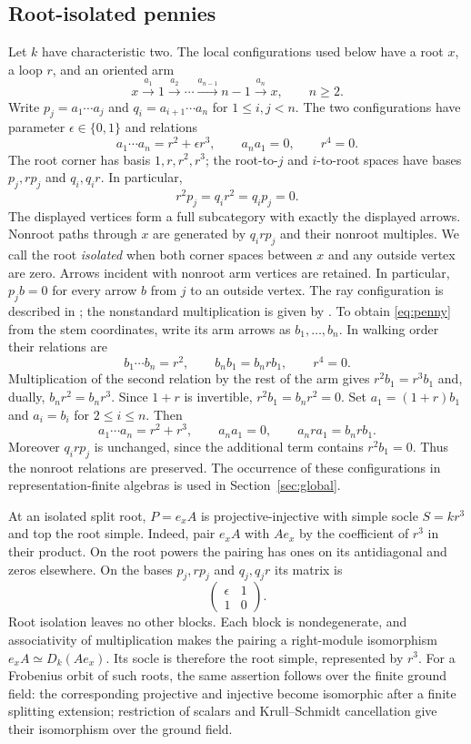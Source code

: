 \subsection{Root-isolated pennies}
Let $k$ have characteristic two. The local configurations used below have a root $x$, a loop $r$, and an oriented arm
\[
 x\xrightarrow{a_1}1\xrightarrow{a_2}\cdots
 \xrightarrow{a_{n-1}}n-1\xrightarrow{a_n}x,\qquad n\ge2.
\]
Write $p_j=a_1\cdots a_j$ and $q_i=a_{i+1}\cdots a_n$ for $1\le i,j<n$. The two configurations have parameter $\epsilon\in\{0,1\}$ and relations
\begin{equation}\label{eq:penny}
 a_1\cdots a_n=r^2+\epsilon r^3,\qquad a_na_1=0,
 \qquad r^4=0.
\end{equation}
The root corner has basis $1,r,r^2,r^3$; the root-to-$j$ and $i$-to-root spaces have bases $p_j,rp_j$ and $q_i,q_ir$. In particular,
\[
 r^2p_j=q_ir^2=q_ip_j=0.
\]
The displayed vertices form a full subcategory with exactly the displayed arrows. Nonroot paths through $x$ are generated by $q_irp_j$ and their nonroot multiples. We call the root \emph{isolated} when both corner spaces between $x$ and any outside vertex are zero. Arrows incident with nonroot arm vertices are retained. In particular, $p_jb=0$ for every arrow $b$ from $j$ to an outside vertex. The ray configuration is described in \cite[\S1 and Proposition 2]{Bongartz12}; the nonstandard multiplication is given by \cite[Theorem 10]{Bongartz13}. To obtain \eqref{eq:penny} from the stem coordinates, write its arm arrows as $b_1,\ldots,b_n$. In walking order their relations are
\[
 b_1\cdots b_n=r^2,\qquad b_nb_1=b_nrb_1,\qquad r^4=0.
\]
Multiplication of the second relation by the rest of the arm gives $r^2b_1=r^3b_1$ and, dually, $b_nr^2=b_nr^3$. Since $1+r$ is invertible, $r^2b_1=b_nr^2=0$. Set $a_1=(1+r)b_1$ and $a_i=b_i$ for $2\le i\le n$. Then
\[
 a_1\cdots a_n=r^2+r^3,\qquad a_na_1=0,
 \qquad a_nra_1=b_nrb_1.
\]
Moreover $q_irp_j$ is unchanged, since the additional term contains $r^2b_1=0$. Thus the nonroot relations are preserved. The occurrence of these configurations in representation-finite algebras is used in Section~\ref{sec:global}.

At an isolated split root, $P=e_xA$ is projective-injective with simple socle $S=kr^3$ and top the root simple. Indeed, pair $e_xA$ with $Ae_x$ by the coefficient of $r^3$ in their product. On the root powers the pairing has ones on its antidiagonal and zeros elsewhere. On the bases $p_j,rp_j$ and $q_j,q_jr$ its matrix is
\[
 \begin{pmatrix}\epsilon&1\\1&0\end{pmatrix}.
\]
Root isolation leaves no other blocks. Each block is nondegenerate, and associativity of multiplication makes the pairing a right-module isomorphism $e_xA\simeq D_k(Ae_x)$. Its socle is therefore the root simple, represented by $r^3$. For a Frobenius orbit of such roots, the same assertion follows over the finite ground field: the corresponding projective and injective become isomorphic after a finite splitting extension; restriction of scalars and Krull--Schmidt cancellation give their isomorphism over the ground field.

